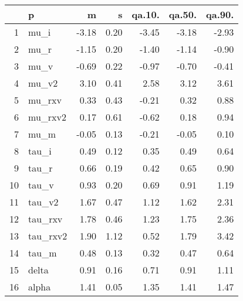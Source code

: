 \begin{table}[ht]
\centering
\begin{tabular}{rlrrrrr}
  \hline
 & p & m & s & qa.10. & qa.50. & qa.90. \\ 
  \hline
1 & mu\_i & -3.18 & 0.20 & -3.45 & -3.18 & -2.93 \\ 
  2 & mu\_r & -1.15 & 0.20 & -1.40 & -1.14 & -0.90 \\ 
  3 & mu\_v & -0.69 & 0.22 & -0.97 & -0.70 & -0.41 \\ 
  4 & mu\_v2 & 3.10 & 0.41 & 2.58 & 3.12 & 3.61 \\ 
  5 & mu\_rxv & 0.33 & 0.43 & -0.21 & 0.32 & 0.88 \\ 
  6 & mu\_rxv2 & 0.17 & 0.61 & -0.62 & 0.18 & 0.94 \\ 
  7 & mu\_m & -0.05 & 0.13 & -0.21 & -0.05 & 0.10 \\ 
  8 & tau\_i & 0.49 & 0.12 & 0.35 & 0.49 & 0.64 \\ 
  9 & tau\_r & 0.66 & 0.19 & 0.42 & 0.65 & 0.90 \\ 
  10 & tau\_v & 0.93 & 0.20 & 0.69 & 0.91 & 1.19 \\ 
  11 & tau\_v2 & 1.67 & 0.47 & 1.12 & 1.62 & 2.31 \\ 
  12 & tau\_rxv & 1.78 & 0.46 & 1.23 & 1.75 & 2.36 \\ 
  13 & tau\_rxv2 & 1.90 & 1.12 & 0.52 & 1.79 & 3.42 \\ 
  14 & tau\_m & 0.48 & 0.13 & 0.32 & 0.47 & 0.64 \\ 
  15 & delta & 0.91 & 0.16 & 0.71 & 0.91 & 1.11 \\ 
  16 & alpha & 1.41 & 0.05 & 1.35 & 1.41 & 1.47 \\ 
   \hline
\end{tabular}
\label{tab:param}
\end{table}
